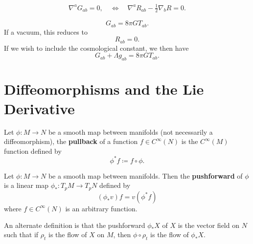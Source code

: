 \documentclass[12pt]{article}
\begin{document}
\begin{noteEquation}
	\begin{align}
		\nabla^aG_{ab} = 0, \quad \Leftrightarrow \quad \nabla^a R_{ab} - \frac{1}{2} \nabla_b R = 0.
	\end{align}
\end{noteEquation}

\begin{noteEquation}
	\begin{equation}
		G_{ab} = 8\pi G T_{ab}.
	\end{equation}
	If a vacuum, this reduces to
	\begin{equation}
		R_{ab} = 0.
	\end{equation}
	If we wish to include the cosmological constant, we then have
	\begin{equation}
		G_{ab} + \Lambda g_{ab} = 8 \pi G T_{ab}.
	\end{equation}
\end{noteEquation}

\section{Diffeomorphisms and the Lie Derivative}


\begin{definition}
	Let $\phi: M \to N$ be a smooth map between manifolds (not necessarily a diffeomorphism), the \textbf{pullback} of a function $f \in C^\infty(N)$ is the $C^\infty(M)$ function defined by
		\begin{equation}
			\phi^* f \coloneqq f \circ \phi.
		\end{equation}
\end{definition}

\begin{definition}[Pushforward]
	Let $\phi: M \to N$ be a smooth map between manifolds. Then the \textbf{pushforward} of $\phi$ is a linear map $\phi_*: T_pM \to T_pN$ defined by
		\begin{equation}
			(\phi_* v) f = v (\phi^* f)
		\end{equation}
	where $f \in C^\infty(N)$ is an arbitrary function.
\end{definition}
\begin{remark}
	An alternate definition is that the pushforward $\phi_*X$ of $X$ is the vector field on $N$ such that if $\rho_t$ is the flow of $X$ on $M$, then $\phi \circ \rho_t$ is the flow of $\phi_* X$.
\end{remark}
\end{document}
